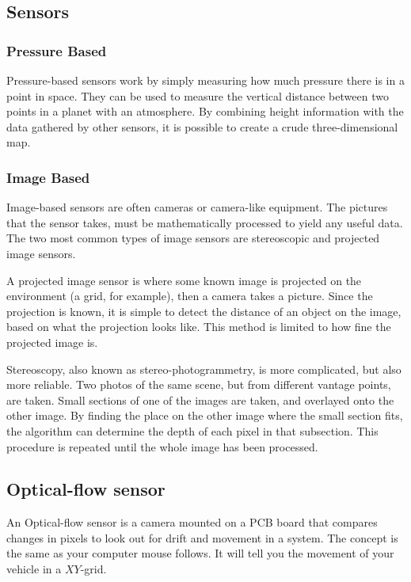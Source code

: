\subsection{Sensors}
\subsubsection{Pressure Based}
Pressure-based sensors work by simply measuring how much pressure there is in a point in space. They can be used to measure the vertical distance between two points in a planet with an atmosphere\cite{barometric1}\cite{barometric2}. By combining height information with the data gathered by other sensors, it is possible to create a crude three-dimensional map.

\subsubsection{Image Based}
Image-based sensors are often cameras or camera-like equipment. The pictures that the sensor takes, must be mathematically processed to yield any useful data. The two most common types of image sensors are stereoscopic and projected image sensors.

A projected image sensor is where some known image is projected on the environment (a grid, for example), then a camera takes a picture. Since the projection is known, it is simple to detect the distance of an object on the image, based on what the projection looks like. This method is limited to how fine the projected image is.

Stereoscopy, also known as stereo-photogrammetry, is more complicated, but also more reliable. Two photos of the same scene, but from different vantage points, are taken. Small sections of one of the images are taken, and overlayed onto the other image. By finding the place on the other image where the small section fits, the algorithm can determine the depth of each pixel in that subsection. This procedure is repeated until the whole image has been processed.

\subsection{Optical-flow sensor}
An Optical-flow sensor is a camera mounted on a PCB board that compares changes in pixels to look out for drift and movement in a system. The concept is the same as your computer mouse follows. It will tell you the movement of your vehicle in a $XY$-grid.

